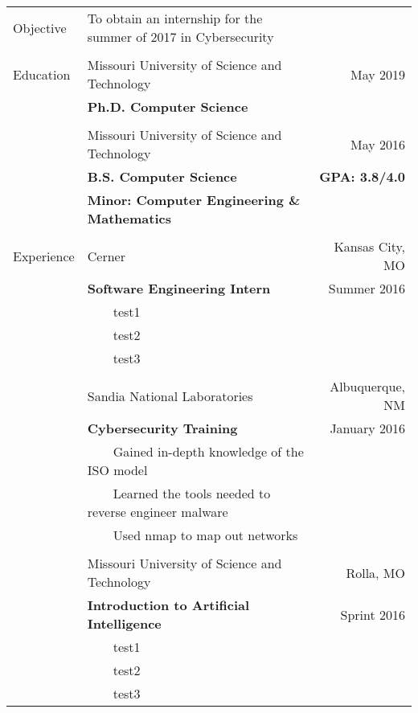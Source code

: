 \documentclass{article}
\newcommand{\tabitem}{~~\llap{\textbullet}~~}
\begin{document}
\begin{tabular}{p{1.5cm} p{10.95cm} r}
Objective  	& To obtain an internship for the summer of 2017 in Cybersecurity 	& 						\\ \\

Education  	& Missouri University of Science and Technology 					& May 2019 				\\
			& \textbf{Ph.D. Computer Science} 									& 						\\ \\

		  	& Missouri University of Science and Technology 					& May 2016 				\\
			& \textbf{B.S. Computer Science} 									& \textbf{GPA: 3.8/4.0} \\
			& \textbf{Minor: Computer Engineering \& Mathematics} 										\\ \\

Experience  & Cerner 															& Kansas City, MO 		\\
			& \textbf{Software Engineering Intern} 								& Summer 2016			\\
			& \tabitem test1 													& 						\\
			& \tabitem test2 													& 						\\
			& \tabitem test3 													& 						\\ \\

			& Sandia National Laboratories										& Albuquerque, NM 		\\
			& \textbf{Cybersecurity Training} 									& January 2016 			\\
			& \tabitem Gained in-depth knowledge of the ISO model 				& 						\\
			& \tabitem Learned the tools needed to reverse engineer malware 	& 						\\
			& \tabitem Used nmap to map out networks 							& 						\\ \\

			& Missouri University of Science and Technology						& Rolla, MO 			\\
			& \textbf{Introduction to Artificial Intelligence} 					& Sprint 2016 			\\
			& \tabitem test1 													& 						\\
			& \tabitem test2 													& 						\\
			& \tabitem test3 													& 						\\


\end{tabular}
\end{document}
